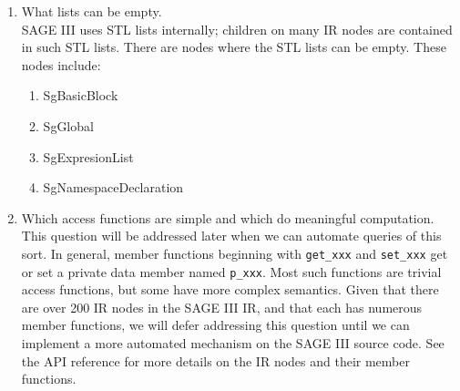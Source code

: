 \begin{enumerate}
\begin{enumerate}
          \item Pointers to {\tt SgBasicBlock}. \\
               All pointers of type SgBasicBlock should be valid pointers.

          \item Other {\tt NULL} pointers \\
               A conscious attempt is made within ROSE to not communicate information
               through a null-valued pointer.  Unfortunately, this has been a 
               switch from the original design of SAGE II, which had {\tt NULL} pointers
               throughout the AST.  In general within the newer work, any NULL pointer is
               currently an error.
     \end{enumerate}

     \item What lists can be empty. \\
          SAGE III uses STL lists internally; children on many IR nodes are contained
          in such STL lists.  There are nodes where the STL lists can be empty.  These 
          nodes include:
     \begin{enumerate}
          \item SgBasicBlock
          \item SgGlobal
          \item SgExpresionList
          \item SgNamespaceDeclaration
     \end{enumerate}

     \item Which access functions are simple and which do meaningful computation. \\
          This question will be addressed later when we can automate queries of this sort.
          In general, member functions beginning with {\tt get\_xxx} and {\tt set\_xxx}
          get or set a private data member named {\tt p\_xxx}.  Most such functions are
          trivial access functions, but some have more complex semantics.  Given that
          there are over 200 IR nodes in the SAGE III IR, and that each has numerous
          member functions, we will defer addressing this question until we can implement
          a more automated mechanism on the SAGE III source code. 
          See the API reference for more details on the IR
          nodes and their member functions.
\end{enumerate}


